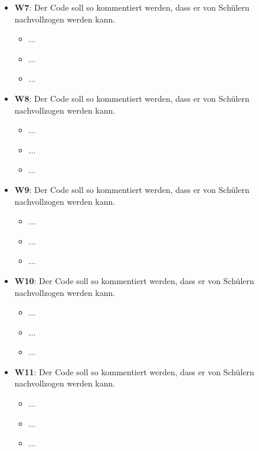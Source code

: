 \documentclass[11pt]{scrreprt}
\begin{document}
\begin{itemize}
\begin{itemize}
    \item ...
    \item ... 
    \end{itemize}
\item \textbf{W7}: Der Code soll so kommentiert werden, dass er von Schülern nachvollzogen werden kann.
    \begin{itemize}
    \item ...
    \item ...
    \item ... 
    \end{itemize}
\item \textbf{W8}: Der Code soll so kommentiert werden, dass er von Schülern nachvollzogen werden kann.
    \begin{itemize}
    \item ...
    \item ...
    \item ... 
    \end{itemize}
\item \textbf{W9}: Der Code soll so kommentiert werden, dass er von Schülern nachvollzogen werden kann.
    \begin{itemize}
    \item ...
    \item ...
    \item ... 
    \end{itemize}
\item \textbf{W10}: Der Code soll so kommentiert werden, dass er von Schülern nachvollzogen werden kann.
    \begin{itemize}
    \item ...
    \item ...
    \item ... 
    \end{itemize}
\item \textbf{W11}: Der Code soll so kommentiert werden, dass er von Schülern nachvollzogen werden kann.
    \begin{itemize}
    \item ...
    \item ...
    \item ... 
    \end{itemize}
    
\end{itemize}
\end{document}
